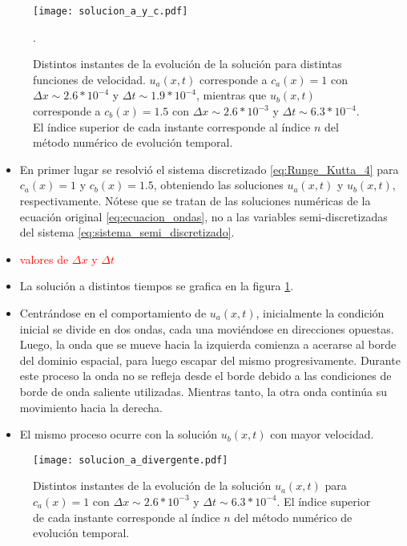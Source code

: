 \documentclass[aps,prb,twocolumn,superscriptaddress,floatfix,longbibliography,10pt]{revtex4-2}
\newcounter{para}
\begin{document}
\begin{figure}[h]
  \texttt{[image: solucion\_a\_y\_c.pdf]}
  \caption{Distintos instantes de la evolución de la solución para distintas funciones de velocidad. $u_a(x,t)$ corresponde a $c_a(x) = 1$ con $\Delta x \sim 2.6*10^{-4}$ y $\Delta t \sim 1.9*10^{-4}$, mientras que $u_b(x,t)$ corresponde a $c_b(x) = 1.5$ con $\Delta x \sim 2.6*10^{-3}$ y $\Delta t \sim 6.3*10^{-4}$. El índice superior de cada instante corresponde al índice $n$ del método numérico de evolución temporal.}.
   \label{fig:solucion_a_y_c}
\end{figure}

\begin{itemize}
  \item En primer lugar se resolvió el sistema discretizado \ref{eq:Runge_Kutta_4} para $c_a(x) = 1$ y $c_b(x) = 1.5$, obteniendo las soluciones $u_a(x,t)$ y $u_b(x,t)$, respectivamente. Nótese que se tratan de las soluciones numéricas de la ecuación original \ref{eq:ecuacion_ondas}, no a las variables semi-discretizadas del sistema \ref{eq:sistema_semi_discretizado}.
  \item \textcolor{red}{valores de $\Delta x$ y $\Delta t$}
  \item La solución a distintos tiempos se grafica en la figura \ref{fig:solucion_a_y_c}.
  \item Centrándose en el comportamiento de $u_a(x,t)$, inicialmente la condición inicial se divide en dos ondas, cada una moviéndose en direcciones opuestas. Luego, la onda que se mueve hacia la izquierda comienza a acerarse al borde del dominio espacial, para luego escapar del mismo progresivamente. Durante este proceso la onda no se refleja desde el borde debido a las condiciones de borde de onda saliente utilizadas. Mientras tanto, la otra onda continúa su movimiento hacia la derecha.
  \item El mismo proceso ocurre con la solución $u_b(x,t)$ con mayor velocidad.
\end{itemize}

\begin{figure}[h]
  \texttt{[image: solucion\_a\_divergente.pdf]}
  \caption{Distintos instantes de la evolución de la solución $u_a(x,t)$ para $c_a(x) = 1$ con $\Delta x \sim 2.6*10^{-3}$ y $\Delta t \sim 6.3*10^{-4}$. El índice superior de cada instante corresponde al índice $n$ del método numérico de evolución temporal.}
   \label{fig:solucion_a_divergente}
\end{figure}
\end{document}
